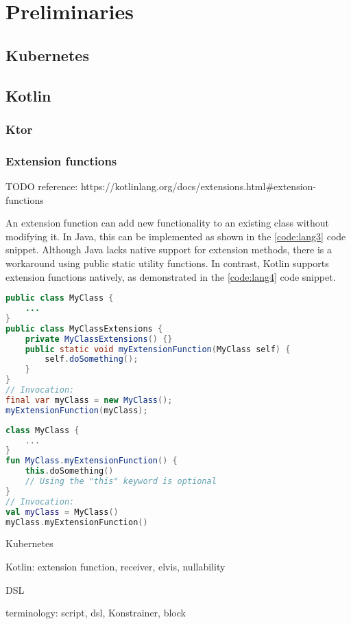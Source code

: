 \setlength{\parindent}{0pt}
\setlength{\parskip}{0.6em}

\chapter{Preliminaries}
\label{chap:prerequisites}

\section{Kubernetes}

\section{Kotlin}

\subsection{Ktor}

\subsection{Extension functions}
\label{sec:extension}

TODO reference: https://kotlinlang.org/docs/extensions.html\#extension-functions

An extension function can add new functionality to an existing class without modifying it. In Java, this can be implemented as shown in the \ref{code:lang3} code snippet. Although Java lacks native support for extension methods, there is a workaround using public static utility functions. In contrast, Kotlin supports extension functions natively, as demonstrated in the \ref{code:lang4} code snippet.

\begin{lstlisting}[caption={Extension functions in Java},language=Java,label=code:lang3]
public class MyClass {
    ...
}
public class MyClassExtensions {
    private MyClassExtensions() {}
    public static void myExtensionFunction(MyClass self) {
        self.doSomething();
    }
}
// Invocation:
final var myClass = new MyClass();
myExtensionFunction(myClass);
\end{lstlisting}

\begin{lstlisting}[caption={Extension functions in Kotlin},language=Kotlin,label=code:lang4]
class MyClass {
    ...
}
fun MyClass.myExtensionFunction() {
    this.doSomething()
    // Using the "this" keyword is optional
}
// Invocation:
val myClass = MyClass()
myClass.myExtensionFunction()
\end{lstlisting}

Kubernetes

Kotlin: extension function, receiver, elvis, nullability

DSL

terminology: script, dsl, Konstrainer, block
